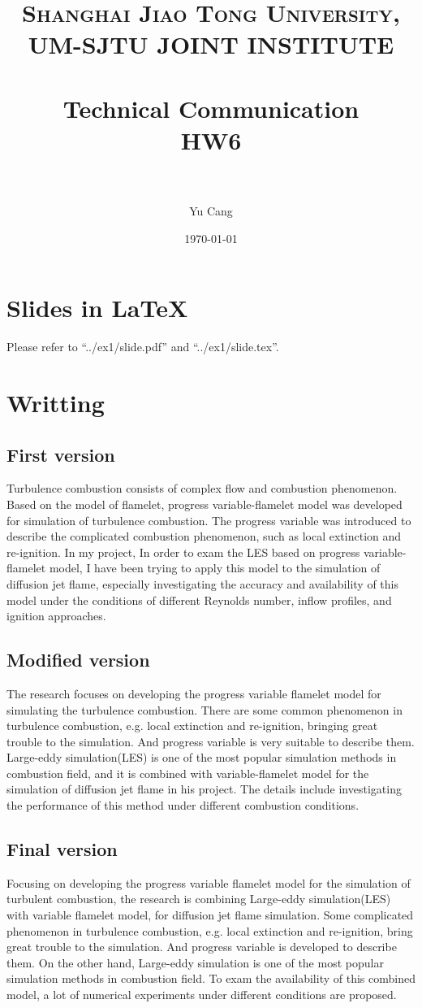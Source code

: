 \documentclass[paper=a4, fontsize=11pt]{scrartcl} %
\title{	
\normalfont \normalsize 
\textsc{Shanghai Jiao Tong University, UM-SJTU JOINT INSTITUTE} \\ [25pt] %
\horrule{0.5pt} \\[0.4cm] %
\huge Technical Communication\\ HW6 \\ %
\horrule{2pt} \\[0.5cm] %
}
\author{Yu Cang \quad 018370210001} %
\date{\normalsize \today} %
\numberwithin{equation}{section} %
\numberwithin{figure}{section} %
\numberwithin{table}{section} %
\begin{document}
\maketitle %

\section{Slides in \LaTeX}
	Please refer to ``../ex1/slide.pdf'' and ``../ex1/slide.tex''.
	
\section{Writting}
	\subsection*{First version}
		Turbulence combustion consists of complex flow and combustion phenomenon. Based on the model of flamelet, progress variable-flamelet model was developed for simulation of turbulence combustion. The progress variable was introduced to describe the complicated combustion phenomenon, such as local extinction and re-ignition. In my project, In order to exam the LES based on progress variable-flamelet model, I have been trying to apply this model to the simulation of diffusion jet flame, especially investigating the accuracy and availability of this model under the conditions of different Reynolds number, inflow profiles, and ignition approaches.
	\subsection*{Modified version}
		The research focuses on developing the progress variable flamelet model for simulating the turbulence combustion. There are some common phenomenon in turbulence combustion, e.g. local extinction and re-ignition, bringing great trouble to the simulation. And progress variable is very suitable to describe them. Large-eddy simulation(LES) is one of the most popular simulation methods in combustion field, and it is combined with variable-flamelet model for the simulation of diffusion jet flame in his project. The details include investigating the performance of this method under different combustion conditions.
	\subsection*{Final version}
		Focusing on developing the progress variable flamelet model for the simulation of turbulent combustion, the research is combining Large-eddy simulation(LES) with variable flamelet model, for diffusion jet flame simulation. Some complicated phenomenon in turbulence combustion, e.g. local extinction and re-ignition, bring great trouble to the simulation. And progress variable is developed to describe them. On the other hand, Large-eddy simulation is one of
		the most popular simulation methods in combustion field. To exam the availability of this combined model, a lot of numerical experiments under different conditions are proposed.
	
\end{document}
